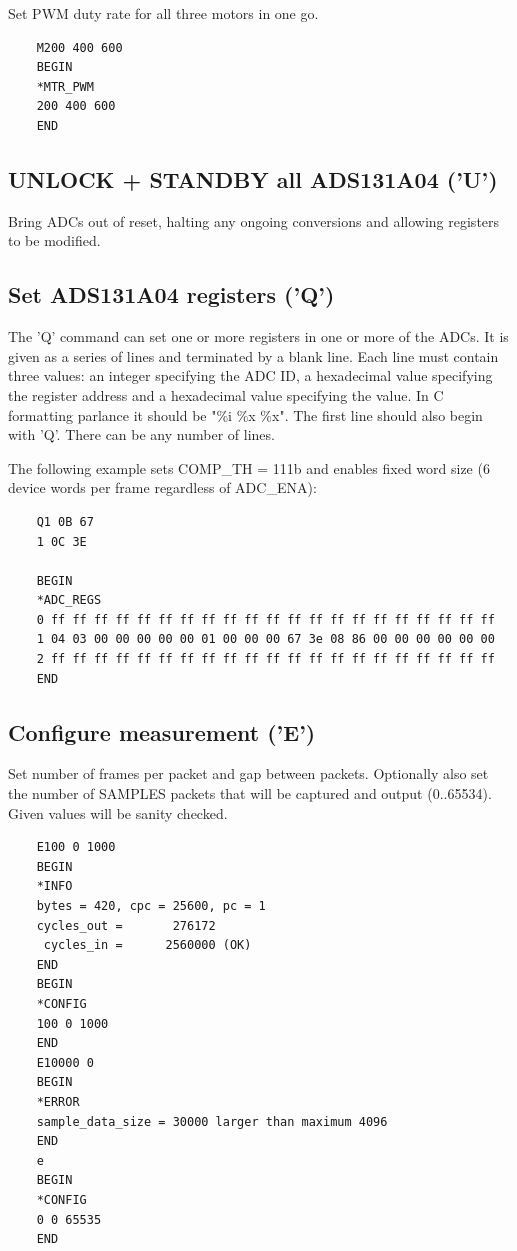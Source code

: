 \documentclass{article}
\begin{document}
Set PWM duty rate for all three motors in one go.

\begin{lstlisting}
    M200 400 600
    BEGIN
    *MTR_PWM
    200 400 600
    END
\end{lstlisting}

\subsection{UNLOCK + STANDBY all ADS131A04 ('U')}

Bring ADCs out of reset, halting any ongoing conversions and allowing registers to be modified.

\subsection{Set ADS131A04 registers ('Q')}

The 'Q' command can set one or more registers in one or more of the ADCs.
It is given as a series of lines and terminated by a blank line.
Each line must contain three values: an integer specifying the ADC ID,
a hexadecimal value specifying the register address and a hexadecimal value specifying the value.
In C formatting parlance it should be "\%i \%x \%x".
The first line should also begin with 'Q'.
There can be any number of lines.

The following example sets COMP\_TH = 111b and enables fixed word size (6 device words per frame regardless of ADC\_ENA):

\begin{lstlisting}
    Q1 0B 67
    1 0C 3E

    BEGIN
    *ADC_REGS
    0 ff ff ff ff ff ff ff ff ff ff ff ff ff ff ff ff ff ff ff ff ff
    1 04 03 00 00 00 00 00 01 00 00 00 67 3e 08 86 00 00 00 00 00 00
    2 ff ff ff ff ff ff ff ff ff ff ff ff ff ff ff ff ff ff ff ff ff
    END
\end{lstlisting}

\subsection{Configure measurement ('E')}

Set number of frames per packet and gap between packets.
Optionally also set the number of SAMPLES packets that will be captured and output (0..65534).
Given values will be sanity checked.

\begin{lstlisting}
    E100 0 1000
    BEGIN
    *INFO
    bytes = 420, cpc = 25600, pc = 1
    cycles_out =       276172
     cycles_in =      2560000 (OK)
    END
    BEGIN
    *CONFIG
    100 0 1000
    END
    E10000 0
    BEGIN
    *ERROR
    sample_data_size = 30000 larger than maximum 4096
    END
    e
    BEGIN
    *CONFIG
    0 0 65535
    END
\end{lstlisting}
\end{document}
